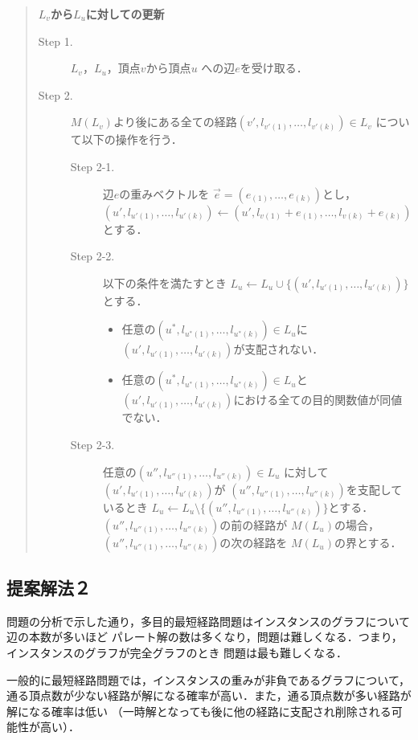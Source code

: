\documentclass[12pt]{optlab-bachelor}
\begin{document}
\begin{quote}
  \textbf{$L_v$から$L_u$に対しての更新}
  \begin{description}
    \item[Step 1.] $L_v$，$L_u$，頂点$v$から頂点$u$ への辺$e$を受け取る．
    \item[Step 2.] $M(L_v)$より後にある全ての経路$(v',l_{v'(1)},\ldots,l_{v'(k)}) \in L_v$
    について以下の操作を行う．
    \begin{description}
      \item[Step 2-1.] 辺$e$の重みベクトルを
      $\vec{e} = (e_{(1)},\ldots,e_{(k)})$とし，
      $(u',l_{u'(1)},\ldots,l_{u'(k)}) \leftarrow
      (u',l_{v(1)}+e_{(1)},\ldots,l_{v(k)}+e_{(k)})$とする．
      \item[Step 2-2.] 以下の条件を満たすとき
      $L_u \leftarrow L_u \cup \{(u',l_{u'(1)},\ldots,l_{u'(k)})\}$とする．
      \begin{itemize}
        \item 任意の$(u^*,l_{u^*(1)},\ldots,l_{u^*(k)})\in L_u$に
        $(u',l_{u'(1)},\ldots,l_{u'(k)})$が支配されない．
        \item 任意の$(u^*,l_{u^*(1)},\ldots,l_{u^*(k)}) \in L_u$と
        $(u',l_{u'(1)},\ldots,l_{u'(k)})$における全ての目的関数値が同値でない．
      \end{itemize}
      \item[Step 2-3.] 任意の$(u'',l_{u''(1)},\ldots,l_{u''(k)})\in L_u$
      に対して$(u',l_{u'(1)},\ldots,l_{u'(k)})$が
      $(u'',l_{u''(1)},\ldots,l_{u''(k)})$を支配しているとき
      $L_u \leftarrow L_u \setminus \{(u'',l_{u''(1)},\ldots,l_{u''(k)})\}$とする．
      $(u'',l_{u''(1)},\ldots,l_{u''(k)})$の前の経路が $M(L_u)$の場合，
      $(u'',l_{u''(1)},\ldots,l_{u''(k)})$の次の経路を $M(L_u)$の界とする．
    \end{description}
  \end{description}
\end{quote}


\subsection{提案解法２}

問題の分析で示した通り，多目的最短経路問題はインスタンスのグラフについて辺の本数が多いほど
パレート解の数は多くなり，問題は難しくなる．つまり，インスタンスのグラフが完全グラフのとき
問題は最も難しくなる．

一般的に最短経路問題では，インスタンスの重みが非負であるグラフについて，
通る頂点数が少ない経路が解になる確率が高い．また，通る頂点数が多い経路が解になる確率は低い
（一時解となっても後に他の経路に支配され削除される可能性が高い）．
\end{document}
